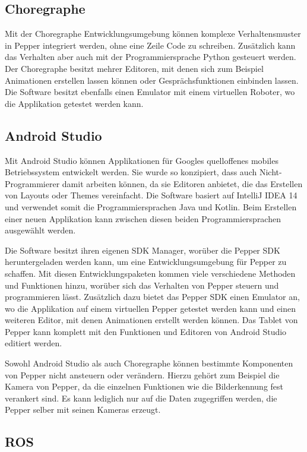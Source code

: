 \subsection{Choregraphe}

Mit der Choregraphe Entwicklungsumgebung können komplexe Verhaltensmuster in Pepper integriert werden, ohne eine Zeile Code zu schreiben. 
Zusätzlich kann das Verhalten aber auch mit der Programmiersprache Python gesteuert werden. Der Choregraphe besitzt mehrer Editoren, 
mit denen sich zum Beispiel Animationen erstellen lassen können oder Gesprächsfunktionen einbinden lassen. Die Software besitzt ebenfalls 
einen Emulator mit einem virtuellen Roboter, wo die Applikation getestet werden kann.
\cite{Choregraphe}

\subsection{Android Studio}

Mit Android Studio können Applikationen für Googles quelloffenes mobiles Betriebssystem entwickelt werden. Sie wurde so konzipiert, dass 
auch Nicht-Programmierer damit arbeiten können, da sie Editoren anbietet, die das Erstellen von Layouts oder Themes vereinfacht. 
Die Software basiert auf IntelliJ IDEA 14 und verwendet somit die Programmiersprachen Java und Kotlin. Beim Erstellen einer neuen 
Applikation kann zwischen diesen beiden Programmiersprachen ausgewählt werden.

Die Software besitzt ihren eigenen SDK Manager, worüber die Pepper SDK heruntergeladen werden kann, um eine Entwicklungsumgebung für Pepper 
zu schaffen. Mit diesen Entwicklungspaketen kommen viele verschiedene Methoden und Funktionen hinzu, worüber sich das Verhalten von Pepper 
steuern und programmieren lässt. Zusätzlich dazu bietet das Pepper SDK einen Emulator an, wo die Applikation auf einem virtuellen Pepper 
getestet werden kann und einen weiteren Editor, mit denen Animationen erstellt werden können. Das Tablet von Pepper kann komplett mit den 
Funktionen und Editoren von Android Studio editiert werden. 

Sowohl Android Studio als auch Choregraphe können bestimmte Komponenten von Pepper nicht ansteuern oder verändern. Hierzu gehört zum 
Beispiel die Kamera von Pepper, da die einzelnen Funktionen wie die Bilderkennung fest verankert sind. Es kann lediglich nur auf die Daten 
zugegriffen werden, die Pepper selber mit seinen Kameras erzeugt.
\cite{Android_Studio}

\subsection{ROS}


